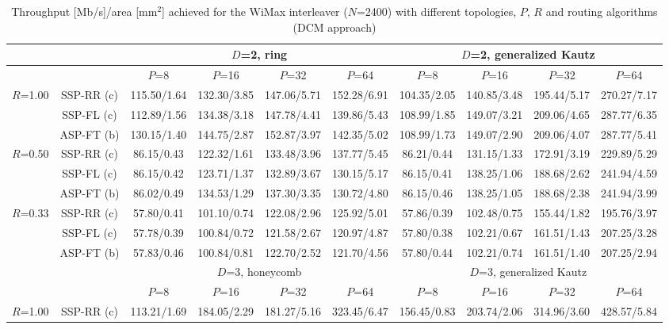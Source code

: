 \documentclass[10pt,twocolumn,journal]{IEEEtran}
\begin{document}
\begin{table*}[t!]
  \centering
  \caption{Throughput [Mb/s]/area [mm$^2$] achieved for the WiMax interleaver ($N$=2400) with different topologies, 
$P$, $R$ and routing algorithms (DCM approach)} \label{tab:wimax_results}
   { \scriptsize
  \begin{tabular}{|c|c|c|c|c|c|c|c|c|c|}
\hline
& 	 & \multicolumn{4}{c|}{$D$=2, ring} & \multicolumn{4}{c|}{$D$=2, generalized Kautz} \\
\hline
& 	 & $P$=8 & $P$=16 & $P$=32 & $P$=64 & $P$=8 & $P$=16 & $P$=32 & $P$=64 \\
\hline
\multirow{3}{*}{$R$=1.00} & SSP-RR (c) & 115.50/1.64 & 132.30/3.85 & 147.06/5.71 & 152.28/6.91 & 104.35/2.05 & 140.85/3.48 & 195.44/5.17 & 270.27/7.17 \\
& SSP-FL (c) & 112.89/1.56 & 134.38/3.18 & 147.78/4.41 & 139.86/5.43 & 108.99/1.85 & 149.07/3.21 & 209.06/4.65 & 287.77/6.35 \\
& ASP-FT (b) & 130.15/1.40 & 144.75/2.87 & 152.87/3.97 & 142.35/5.02 & 108.99/1.73 & 149.07/2.90 & 209.06/4.07 & 287.77/5.41 \\
\hline
\multirow{3}{*}{$R$=0.50} & SSP-RR (c) & 86.15/0.43 & 122.32/1.61 & 133.48/3.96 & 137.77/5.45 & 86.21/0.44 & 131.15/1.33 & 172.91/3.19 & 229.89/5.29 \\
& SSP-FL (c) & 86.15/0.42 & 123.71/1.37 & 132.89/3.67 & 130.15/5.17 & 86.15/0.41 & 138.25/1.06 & 188.68/2.62 & 241.94/4.59 \\
& ASP-FT (b) & 86.02/0.49 & 134.53/1.29 & 137.30/3.35 & 130.72/4.80 & 86.15/0.46 & 138.25/1.05 & 188.68/2.38 & 241.94/3.99 \\
\hline
\multirow{3}{*}{$R$=0.33} & SSP-RR (c) & 57.80/0.41 & 101.10/0.74 & 122.08/2.96 & 125.92/5.01 & 57.86/0.39 & 102.48/0.75 & 155.44/1.82 & 195.76/3.97 \\
& SSP-FL (c) & 57.78/0.39 & 100.84/0.72 & 121.58/2.67 & 120.97/4.87 & 57.80/0.38 & 102.21/0.67 & 161.51/1.43 & 207.25/3.28 \\
& ASP-FT (b) & 57.83/0.46 & 100.84/0.81 & 122.70/2.52 & 121.70/4.56 & 57.80/0.44 & 102.21/0.74 & 161.51/1.40 & 207.25/2.94 \\
\hline
\hline
& 	 & \multicolumn{4}{c|}{$D$=3, honeycomb} & \multicolumn{4}{c|}{$D$=3, generalized Kautz} \\
\hline
& 	 & $P$=8 & $P$=16 & $P$=32 & $P$=64 & $P$=8 & $P$=16 & $P$=32 & $P$=64 \\
\hline
\multirow{3}{*}{$R$=1.00} & SSP-RR (c) & 113.21/1.69 & 184.05/2.29 & 181.27/5.16 & 323.45/6.47 & 156.45/0.83 & 203.74/2.06 & 314.96/3.60 & 428.57/5.84 \\

\end{tabular}}
\end{table*}
\end{document}
